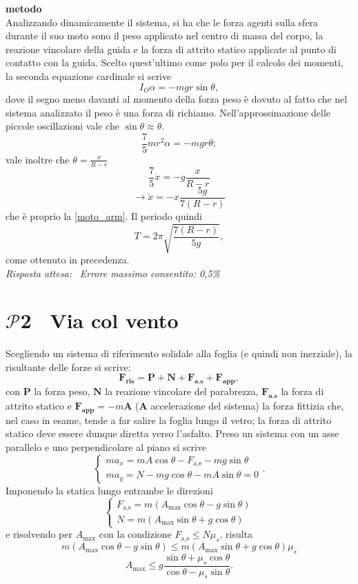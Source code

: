 \documentclass[a4paper,12pt]{article}
\newcommand{\problemtitle}[1]{
  \noindent
  \textbf{\Large #1}\hspace{0.5em}
  \raisebox{0.6ex}{\rule{\linewidth - \widthof{\textbf{\Large #1}} - 0.6em}{0.4pt}}%
}
\begin{document}
\noindent
\textbf{ metodo} \\
Analizzando dinamicamente il sistema, si ha che le forza agenti sulla sfera durante il suo moto sono il peso applicato nel centro di massa del corpo, la reazione vincolare della guida e la forza di attrito statico applicate al punto di contatto con la guida. Scelto quest'ultimo come polo per il calcolo dei momenti, la seconda equazione cardinale si scrive
\[
I_O\alpha = -mgr\sin\theta, \tag{1.11}
\] 
dove il segno meno davanti al momento della forza peso è dovuto al fatto che nel sistema analizzato il peso è una forza di richiamo. Nell'approssimazione delle piccole oscillazioni vale che $\sin \theta \approx \theta$.
\[
\frac{7}{5}mr^2 \alpha = -mgr\theta; \tag{1.12}
\] 
vale inoltre che $\theta = \frac{x}{R-r}$ 
\[
\frac{7}{5}\ddot{x} = -g\frac{x}{R-r} \tag{1.13}
\]
\[
\rightarrow \ddot{x} = -x\frac{5g}{7(R-r)} \tag{1.14}
\]
che è proprio la \ref{moto_arm}. Il periodo quindi
\[
T = 2\pi \sqrt{\frac{7(R-r)}{5g}}, \tag{1.15}
\]
come ottenuto in precedenza. \\

\textit{Risposta attesa:}  \, \textit{Errore massimo consentito: 0,5\%}




\section*{\problemtitle{$\mathcal{P}${\small{2}} \ Via col vento}}

Scegliendo un sistema di riferimento solidale alla foglia (e quindi non inerziale), la risultante delle forze si scrive:
\[
\mathbf{F_{\text{ris}}} = \mathbf{P} + \mathbf{N} + \mathbf{F_{\text{a,s}}} + \mathbf{F_{\text{app}}}, \tag{2.0}
\] 
con $\mathbf{P}$ la forza peso, $\mathbf{N}$ la reazione vincolare del parabrezza, $\mathbf{F_{\text{a,s}}}$ la forza di attrito statico e $\mathbf{F_{\text{app}}} = -m\mathbf{A}$  ($\mathbf{A}$ accelerazione del sistema) la forza fittizia che, nel caso in esame, tende a far salire la foglia lungo il vetro; la forza di attrito statico deve essere dunque diretta verso l'asfalto. Preso un sistema con un asse parallelo e uno perpendicolare al piano si scrive
\[
\begin{cases}
ma_x = mA \cos\theta - F_{\text{a,s}} - mg\sin\theta \\
ma_y = N - mg \cos\theta - mA\sin\theta = 0
\end{cases}
.
\tag{2.1}
\]
Imponendo la statica lungo entrambe le direzioni
\[
\begin{cases}
F_{\text{a,s}} = m(A_{\text{max}} \cos\theta  - g\sin\theta) \\
N = m(A_{\text{max}}\sin\theta + g \cos\theta)
\end{cases}
\tag{2.2}
\]
e risolvendo per $A_{\text{max}}$ con la condizione $F_{\text{a,s}} \leq N\mu_s $, risulta
\[
m(A_{\text{max}} \cos\theta  - g\sin\theta) \leq m(A_{\text{max}}\sin\theta + g \cos\theta)\mu_s \tag{2.3}
\]
\[
A_{\text{max}} \leq g\frac{\sin\theta + \mu_s \cos\theta}{\cos\theta - \mu_s \sin\theta}. \tag{2.4}
\]
\end{document}

